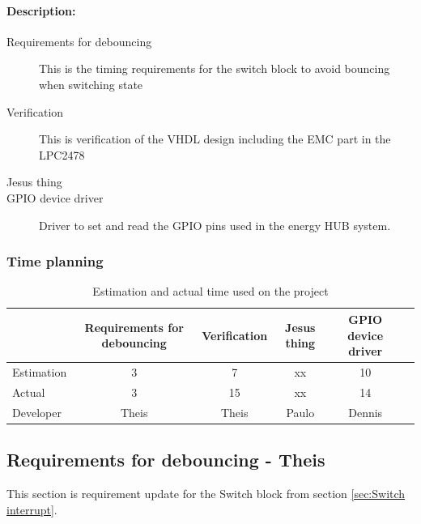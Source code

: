 \paragraph{Description:}
\begin{description}
	\item[Requirements for debouncing] This is the timing requirements for the switch block to avoid bouncing when switching state
	\item[Verification] This is verification of the VHDL design including the EMC part in the LPC2478
	\item[Jesus thing]
	\item[GPIO device driver] Driver to set and read the GPIO pins used in the energy HUB system. 
\end{description}

\subsubsection{Time planning}

\begin{table}[H]
\centering
	\begin{tabular}{|l|c|c|c|c|c|}
		\hline
		~			& Requirements for debouncing	& Verification			& Jesus thing		& GPIO device driver	\\ \hline
		Estimation	& 3							& 7					& xx				& 10			\\
		Actual		& 3 							& 15					& xx				& 14			\\
		Developer	& Theis						& Theis				& Paulo			& Dennis		\\
		\hline
	\end{tabular}
	\caption{Estimation and actual time used on the project}
\end{table}
\subsection{Requirements for debouncing - Theis}
%
This section is requirement update for the Switch block from section \ref{sec:Switch interrupt}.
